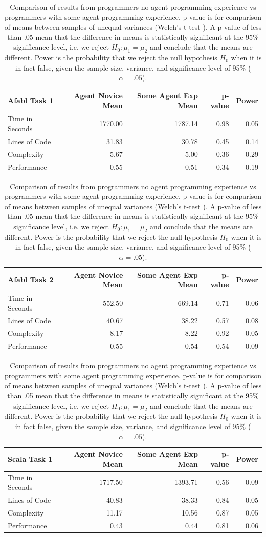 \begin{center}
\begin{table}[h]
\caption{Comparison of results from programmers no agent programming experience vs programmers with some agent programming experience. p-value is for comparison of means between samples of unequal variances (Welch's t-test \cite{welch1947generalization}). A p-value of less than .05 mean that the difference in means is statistically significant at the 95\% significance level, i.e. we reject $H_0: \mu_1 = \mu_2$ and conclude that the means are different. Power is the probability that we reject the null hypothesis $H_0$ when it is in fact false, given the sample size, variance, and significance level of 95\% ($\alpha = .05$).}

\begin{center}

\begin{tabular}{|l|r|r|r|r|}\hline
Afabl Task 1 & Agent Novice Mean & Some Agent Exp Mean & p-value & Power\\\hline
Time in Seconds & 1770.00 & 1787.14 & 0.98 & 0.05\\
Lines of Code & 31.83 & 30.78 & 0.45 & 0.14\\
Complexity & 5.67 & 5.00 & 0.36 & 0.29\\
Performance & 0.55 & 0.51 & 0.34 & 0.19\\
\hline
\end{tabular}


\begin{tabular}{|l|r|r|r|r|}\hline
Afabl Task 2 & Agent Novice Mean & Some Agent Exp Mean & p-value & Power\\\hline
Time in Seconds & 552.50 & 669.14 & 0.71 & 0.06\\
Lines of Code & 40.67 & 38.22 & 0.57 & 0.08\\
Complexity & 8.17 & 8.22 & 0.92 & 0.05\\
Performance & 0.55 & 0.54 & 0.54 & 0.09\\
\hline
\end{tabular}


\begin{tabular}{|l|r|r|r|r|}\hline
Scala Task 1 & Agent Novice Mean & Some Agent Exp Mean & p-value & Power\\\hline
Time in Seconds & 1717.50 & 1393.71 & 0.56 & 0.09\\
Lines of Code & 40.83 & 38.33 & 0.84 & 0.05\\
Complexity & 11.17 & 10.56 & 0.87 & 0.05\\
Performance & 0.43 & 0.44 & 0.81 & 0.06\\
\hline
\end{tabular}



\end{center}
\end{table}
\end{center}
